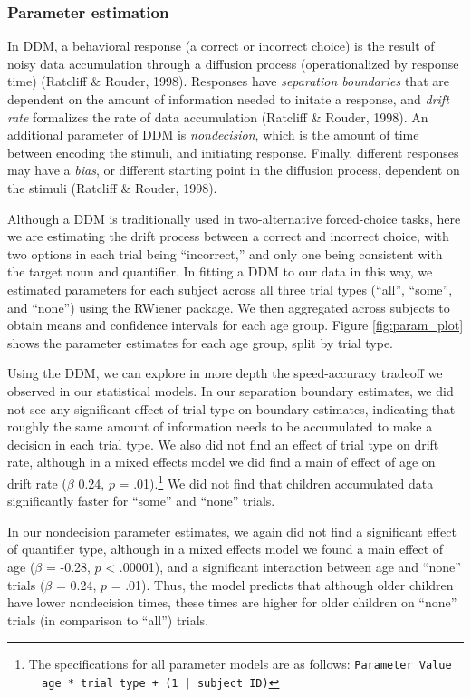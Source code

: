 \documentclass[10pt, letterpaper]{article}
\begin{document}
\subsubsection{Parameter estimation}\label{parameter-estimation}

In DDM, a behavioral response (a correct or incorrect choice) is the
result of noisy data accumulation through a diffusion process
(operationalized by response time) (Ratcliff \& Rouder, 1998). Responses
have \emph{separation boundaries} that are dependent on the amount of
information needed to initate a response, and \emph{drift rate}
formalizes the rate of data accumulation (Ratcliff \& Rouder, 1998). An
additional parameter of DDM is \emph{nondecision}, which is the amount
of time between encoding the stimuli, and initiating response. Finally,
different responses may have a \emph{bias}, or different starting point
in the diffusion process, dependent on the stimuli (Ratcliff \& Rouder,
1998).

Although a DDM is traditionally used in two-alternative forced-choice
tasks, here we are estimating the drift process between a correct and
incorrect choice, with two options in each trial being ``incorrect,''
and only one being consistent with the target noun and quantifier. In
fitting a DDM to our data in this way, we estimated parameters for each
subject across all three trial types (``all'', ``some'', and ``none'')
using the RWiener package. We then aggregated across subjects to obtain
means and confidence intervals for each age group. Figure
\ref{fig:param_plot} shows the parameter estimates for each age group,
split by trial type.

Using the DDM, we can explore in more depth the speed-accuracy tradeoff
we observed in our statistical models. In our separation boundary
estimates, we did not see any significant effect of trial type on
boundary estimates, indicating that roughly the same amount of
information needs to be accumulated to make a decision in each trial
type. We also did not find an effect of trial type on drift rate,
although in a mixed effects model we did find a main of effect of age on
drift rate (\(\beta\) 0.24, \(p\) =
.01).\footnote{The specifications for all parameter models are as follows: \texttt{Parameter Value ~ age * trial type + (1 | subject ID)}}
We did not find that children accumulated data significantly faster for
``some'' and ``none'' trials.

In our nondecision parameter estimates, we again did not find a
significant effect of quantifier type, although in a mixed effects model
we found a main effect of age (\(\beta\) = -0.28, \(p\) \textless{}
.00001), and a significant interaction between age and ``none'' trials
(\(\beta\) = 0.24, \(p\) = .01). Thus, the model predicts that although
older children have lower nondecision times, these times are higher for
older children on ``none'' trials (in comparison to ``all'') trials.
\end{document}
